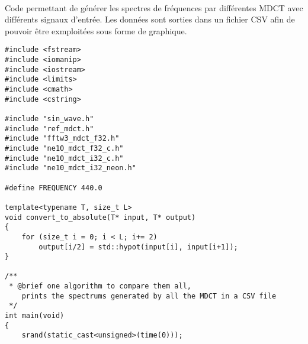 \documentclass{article}
\begin{document}
\paragraph{}
Code permettant de générer les spectres de fréquences par différentes MDCT avec différents signaux d'entrée. Les données sont sorties dans un fichier CSV afin de pouvoir être exmploitées sous forme de graphique.
\lstset{language=C++}
\begin{lstlisting}
#include <fstream>
#include <iomanip>
#include <iostream>
#include <limits>
#include <cmath>
#include <cstring>

#include "sin_wave.h"
#include "ref_mdct.h"
#include "fftw3_mdct_f32.h"
#include "ne10_mdct_f32_c.h"
#include "ne10_mdct_i32_c.h"
#include "ne10_mdct_i32_neon.h"

#define FREQUENCY 440.0

template<typename T, size_t L>
void convert_to_absolute(T* input, T* output)
{
    for (size_t i = 0; i < L; i+= 2)
        output[i/2] = std::hypot(input[i], input[i+1]);
}

/**
 * @brief one algorithm to compare them all,
    prints the spectrums generated by all the MDCT in a CSV file
 */
int main(void)
{
    srand(static_cast<unsigned>(time(0)));


\end{lstlisting}
\end{document}

